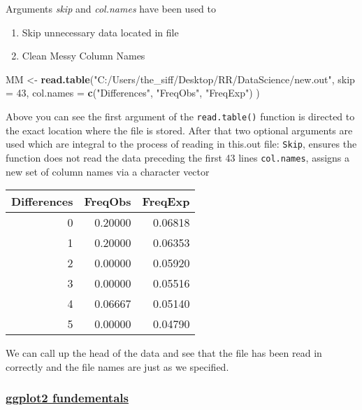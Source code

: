 \documentclass[]{article}
\newenvironment{Shaded}{\begin{snugshade}}{\end{snugshade}}
\newcommand{\KeywordTok}[1]{\textcolor[rgb]{0.13,0.29,0.53}{\textbf{#1}}}
\newcommand{\DataTypeTok}[1]{\textcolor[rgb]{0.13,0.29,0.53}{#1}}
\newcommand{\DecValTok}[1]{\textcolor[rgb]{0.00,0.00,0.81}{#1}}
\newcommand{\StringTok}[1]{\textcolor[rgb]{0.31,0.60,0.02}{#1}}
\newcommand{\OperatorTok}[1]{\textcolor[rgb]{0.81,0.36,0.00}{\textbf{#1}}}
\newcommand{\NormalTok}[1]{#1}
\providecommand{\tightlist}{%
  \setlength{\itemsep}{0pt}\setlength{\parskip}{0pt}}
\begin{document}
Arguments \emph{skip} and \emph{col.names} have been used to

\begin{enumerate}
\def\labelenumi{\arabic{enumi}.}
\tightlist
\item
  Skip unnecessary data located in file
\item
  Clean Messy Column Names
\end{enumerate}

\begin{Shaded}
\begin{Highlighting}[]
\NormalTok{MM <-}\StringTok{ }\KeywordTok{read.table}\NormalTok{(}\StringTok{"C:/Users/the_siff/Desktop/RR/DataScience/new.out"}\NormalTok{,}
  \DataTypeTok{skip =} \DecValTok{43}\NormalTok{,}
  \DataTypeTok{col.names =} \KeywordTok{c}\NormalTok{(}\StringTok{"Differences"}\NormalTok{, }\StringTok{"FreqObs"}\NormalTok{, }\StringTok{"FreqExp"}\NormalTok{)}
\NormalTok{)}
\end{Highlighting}
\end{Shaded}

Above you can see the first argument of the \texttt{read.table()}
function is directed to the exact location where the file is stored.
After that two optional arguments are used which are integral to the
process of reading in this.out file: \texttt{Skip}, ensures the function
does not read the data preceding the first 43 lines \texttt{col.names},
assigns a new set of column names via a character vector

\begin{Shaded}
\end{Shaded}

\begin{longtable}[]{@{}rrr@{}}
\toprule
Differences & FreqObs & FreqExp\tabularnewline
\midrule
\endhead
0 & 0.20000 & 0.06818\tabularnewline
1 & 0.20000 & 0.06353\tabularnewline
2 & 0.00000 & 0.05920\tabularnewline
3 & 0.00000 & 0.05516\tabularnewline
4 & 0.06667 & 0.05140\tabularnewline
5 & 0.00000 & 0.04790\tabularnewline
\bottomrule
\end{longtable}

We can call up the head of the data and see that the file has been read
in correctly and the file names are just as we specified.

\subsubsection{\texorpdfstring{\href{sheading-2}{ggplot2
fundementals}}{ggplot2 fundementals}}\label{ggplot2-fundementals}
\end{document}
